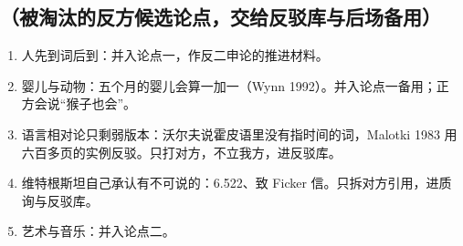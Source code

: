 \documentclass[prep,both]{debate}
\begin{document}
\subsection{（被淘汰的反方候选论点，交给反驳库与后场备用）}
\begin{enumerate}[leftmargin=1.8em]
\item 人先到词后到：并入论点一，作反二申论的推进材料。
\item 婴儿与动物：五个月的婴儿会算一加一（Wynn 1992）。并入论点一备用；正方会说“猴子也会”。
\item 语言相对论只剩弱版本：沃尔夫说霍皮语里没有指时间的词，Malotki 1983 用六百多页的实例反驳。只打对方，不立我方，进反驳库。
\item 维特根斯坦自己承认有不可说的：6.522、致 Ficker 信。只拆对方引用，进质询与反驳库。
\item 艺术与音乐：并入论点二。
\end{enumerate}
\end{document}

